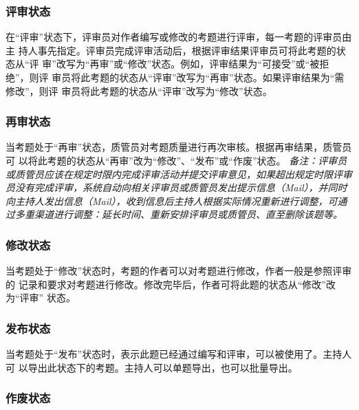 \documentclass[hyperref, a4paper]{ctexart}
\begin{document}
\hypertarget{ux8bc4ux5ba1ux72b6ux6001}{%
\subsubsection{评审状态}\label{ux8bc4ux5ba1ux72b6ux6001}}

在``评审''状态下，评审员对作者编写或修改的考题进行评审，每一考题的评审员由主
持人事先指定。评审员完成评审活动后，根据评审结果评审员可将此考题的状态从``评
审''改写为``再审''或``修改''状态。例如，评审结果为``可接受''或``被拒绝''，则评
审员将此考题的状态从``评审''改写为``再审''状态。如果评审结果为``需修改''，则评
审员将此考题的状态从``评审''改写为``修改''状态。

\hypertarget{ux518dux5ba1ux72b6ux6001}{%
\subsubsection{再审状态}\label{ux518dux5ba1ux72b6ux6001}}

当考题处于``再审''状态，质管员对考题质量进行再次审核。根据再审结果，质管员可
以将此考题的状态从``再审''改为``修改''、``发布''或``作废''状态。
\emph{备注：评审员或质管员应该在规定时限内完成评审活动并提交评审意见，如果超出规定时限评审员没有完成评审，系统自动向相关评审员或质管员发出提示信息（Mail），并同时向主持人发出信息（Mail），收到信息后主持人根据实际情况重新进行调整，可通过多重渠道进行调整：延长时间、重新安排评审员或质管员、直至删除该题等。}

\hypertarget{ux4feeux6539ux72b6ux6001}{%
\subsubsection{修改状态}\label{ux4feeux6539ux72b6ux6001}}

当考题处于``修改''状态时，考题的作者可以对考题进行修改，作者一般是参照评审的
记录和要求对考题进行修改。修改完毕后，作者可将此题的状态从``修改''改为``评审''
状态。

\hypertarget{ux53d1ux5e03ux72b6ux6001}{%
\subsubsection{发布状态}\label{ux53d1ux5e03ux72b6ux6001}}

当考题处于``发布''状态时，表示此题已经通过编写和评审，可以被使用了。主持人可
以导出此状态下的考题。主持人可以单题导出，也可以批量导出。

\hypertarget{ux4f5cux5e9fux72b6ux6001}{%
\subsubsection{作废状态}\label{ux4f5cux5e9fux72b6ux6001}}
\end{document}
